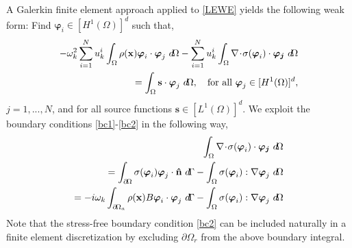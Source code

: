 A Galerkin finite element approach applied to \eqref{LEWE} yields the following weak form: Find $\boldsymbol \varphi_i \in [H^1(\Omega)]^d$  such that,
\begin{align*}
-{\omega}_k^2 \sum_{i=1}^N u_k^i \int_{\Omega} \rho(\mathbf{x}) \boldsymbol\varphi_i \cdot \boldsymbol\varphi_j \ d \!\Omega - \sum_{i=1}^N u_k^i \int_\Omega \nabla \! \cdot \! \sigma(\boldsymbol\varphi_i) \cdot \boldsymbol{\varphi_j} \ d \! \Omega  \\ = \int_\Omega \mathbf{s} \cdot \boldsymbol\varphi_j \ d \! \Omega, \quad \text{for all }  \boldsymbol \varphi_j \in [H^1(\Omega)]^d,
\end{align*}
$j=1,...,N$, and for all source functions $\mathbf{s} \in [L^1(\Omega)]^d$. We exploit the boundary conditions \eqref{bc1}-\eqref{bc2} in the following way,
\begin{align*}
 \int_\Omega \nabla \! \cdot \! \sigma(\boldsymbol\varphi_i) \cdot \boldsymbol{\varphi_j} \ d \! \Omega \\ =  \int_{\partial \! \Omega} \sigma(\boldsymbol\varphi_i) \boldsymbol\varphi_j \cdot \mathbf{\hat n} \ d \! \Gamma - \int_\Omega \sigma(\boldsymbol\varphi_i) : \nabla \boldsymbol\varphi_j \ d \! \Omega \\
 = -i \shift_k \int_{\partial \! \Omega_a} \rho(\mathbf{x})B \boldsymbol\varphi_i \cdot \boldsymbol\varphi_j \ d \! \Gamma - \int_\Omega \sigma(\boldsymbol\varphi_i) : \nabla \boldsymbol\varphi_j \ d \! \Omega
\end{align*}
Note that the stress-free boundary condition \eqref{bc2} can be included naturally in a finite element discretization by excluding $\partial \! \Omega_r$ from the above boundary integral.

